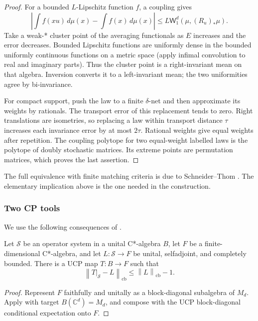 \begin{proof}
For a bounded $L$-Lipschitz function $f$, a coupling gives 
\begin{equation*}
\left|\int f(xu)\,d\mu(x)-\int f(x)\,d\mu(x)\right| \leq L\mathsf{W}_1^d(\mu,(R_u)_*\mu).
\end{equation*}
Take a weak-* cluster point of the averaging functionals as $E$ increases
and the error decreases. Bounded Lipschitz functions are uniformly dense in
the bounded uniformly continuous functions on a metric space (apply infimal
convolution to real and imaginary parts). Thus the cluster point is a
right-invariant mean on that algebra. Inversion converts it to a
left-invariant mean; the two uniformities agree by bi-invariance.

For compact support, push the law to a finite $\delta$-net and then
approximate its weights by rationals. The transport error of this
replacement tends to zero. Right translations are isometries, so replacing a
law within transport distance $\tau$ increases each invariance error by at
most $2\tau$. Rational weights give equal weights after repetition. The
coupling polytope for two equal-weight labelled laws is the polytope of
doubly stochastic matrices. Its extreme points are permutation matrices,
which proves the last assertion.
\end{proof}

The full equivalence with finite matching criteria is due to Schneider--Thom 
\cite{SchneiderThom2018}. The elementary implication above is the one needed in the
construction.


\subsubsection{Two CP tools}

We use the following consequences of \cite{KirchbergPhillips2000}.

\begin{lemma}\label{lem:cu-repair}
 Let $\mathcal{S}$ be an operator system in a unital C*-algebra $B$, let $F$ be a finite-dimensional C*-algebra, and let $L:\mathcal{S}\to F$ be unital, selfadjoint, and completely bounded. There is a
UCP map $T:B\to F$ such that 
\begin{equation*}
\left\|T|_{\mathcal{S}}-L\right\|_{\mathrm{cb}}\leq\left\|L\right\|_{\mathrm{cb}}-1.
\end{equation*}
\end{lemma}

\begin{proof}
Represent $F$ faithfully and unitally as a block-diagonal subalgebra of $M_d$. Apply \cite[Lemma 1.6]{KirchbergPhillips2000} with target $B(\mathbb{C}^d)=M_d$, and compose
with the UCP block-diagonal conditional expectation onto $F$.
\end{proof}

